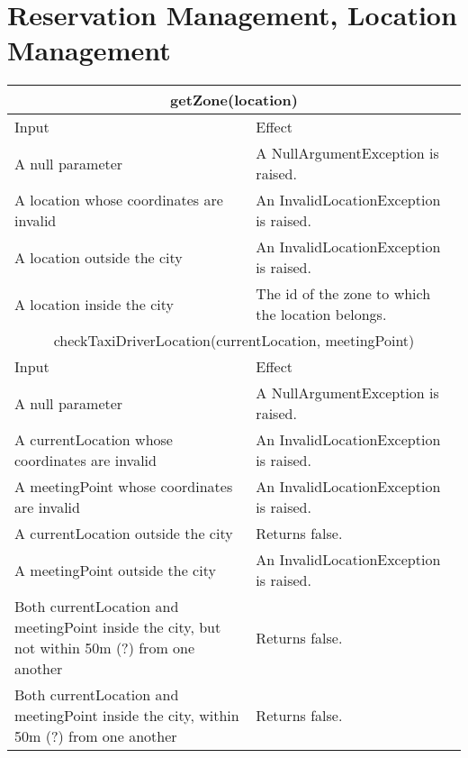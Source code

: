 \documentclass[11pt,oneside,a4paper]{report}
\begin{document}
\section{Reservation Management, Location Management}
\begin{tabular}{p{5cm}|p{6cm}}
\hline
	\multicolumn{2}{c}{getZone(location)}\\\hline
	Input & Effect \\\hline
	A null parameter &
	A NullArgumentException is raised.\\\hline
	A location whose coordinates are invalid &
	An InvalidLocationException is raised. \\\hline
	A location outside the city &
	An InvalidLocationException is raised. \\\hline
	A location inside the city &
	The id of the zone to which the location belongs. \\\hline\hline
		
	\multicolumn{2}{c}{	checkTaxiDriverLocation(currentLocation, meetingPoint)}\\\hline
	Input & Effect \\\hline
	A null parameter &
	A NullArgumentException is raised. \\\hline
	A currentLocation whose coordinates are invalid &
	An InvalidLocationException is raised. \\\hline
	A meetingPoint whose coordinates are invalid &
	An InvalidLocationException is raised. \\\hline
	A currentLocation outside the city &
	Returns false. \\\hline
	A meetingPoint outside the city & 
	An InvalidLocationException is raised. \\\hline
	Both currentLocation and meetingPoint inside the city, but not within 50m (?) from one another &
	Returns false. \\\hline
	Both currentLocation and meetingPoint inside the city, within 50m (?) from one another &
	Returns false. \\\hline
\end{tabular}
\end{document}
